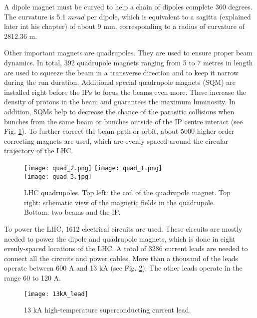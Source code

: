 \begin{normalsize}
A  dipole magnet  must  be  curved to help a chain of dipoles complete 360 degrees. The curvature is 5.1 $mrad$ per dipole, which is equivalent to a  sagitta (explained later int his chapter) of  about  9 mm, corresponding to a radius of curvature of 2812.36 m.


Other important magnets are quadrupoles. They are used to ensure proper beam dynamics. In total, 392 quadrupole magnets ranging from 5 to 7 metres in length are used to squeeze the beam in a transverse direction and to keep it narrow during the run duration. Additional special quadrupole magnets (SQM) are installed right before the IPs to focus the beams even more. These increase the density of protons in the beam and guarantees the maximum luminosity. In addition, SQMs help to decrease the chance of the parasitic collisions when bunches from the same beam or bunches outside of the IP centre interact (see Fig. \ref{quadrupoles}). To further correct the beam path or orbit, about 5000 higher order correcting magnets are used, which are evenly spaced around the circular trajectory of the LHC. 


\begin{figure}[H]
\centering
\texttt{[image: quad\_2.png]}
\texttt{[image: quad\_1.png]}\\
\vspace{0.5cm}
\texttt{[image: quad\_3.jpg]}
\caption[LHC quadrupoles]{LHC quadrupoles. Top left: the coil of the quadrupole magnet. Top right: schematic view of the magnetic fields in the quadrupole. Bottom: two beams and the IP.}
\label{quadrupoles}
\end{figure}

To power the LHC, 1612 electrical circuits are used. These circuits are mostly needed to power the dipole and quadrupole magnets, which is done in eight evenly-spaced locations of the LHC. A total of 3286 current leads are needed to connect all the circuits and power cables. More than a thousand of the leads operate between 600 A and 13 kA (see Fig. \ref{13kA_lead}). The other leads operate in the range 60 to 120 A. 


\begin{figure}[H]
  \centering
  \texttt{[image: 13kA\_lead]}
  \caption{13 kA high-temperature superconducting current lead.}\label{13kA_lead}
\end{figure}




\end{normalsize}
